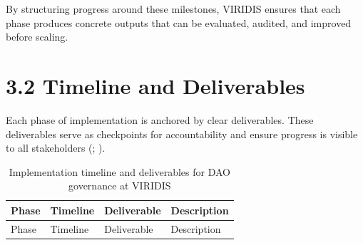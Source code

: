 \documentclass[
  english,
  12pt,
  oneside,
  open=any]{scrbook}
\begin{document}
By structuring progress around these milestones, VIRIDIS ensures that
each phase produces concrete outputs that can be evaluated, audited, and
improved before scaling.

\section{3.2 Timeline and Deliverables}\label{timeline-and-deliverables}

Each phase of implementation is anchored by clear deliverables. These
deliverables serve as checkpoints for accountability and ensure progress
is visible to all stakeholders
(;
).

\begin{longtable}[]{@{}
  >{\raggedright\arraybackslash}p{}
  >{\raggedright\arraybackslash}p{}
  >{\raggedright\arraybackslash}p{}
  >{\raggedright\arraybackslash}p{}@{}}
\caption{Implementation timeline and deliverables for DAO governance at
VIRIDIS}\label{tbl-timeline}\tabularnewline
\toprule\noalign{}
\begin{minipage}[b]{\linewidth}\raggedright
Phase
\end{minipage} & \begin{minipage}[b]{\linewidth}\raggedright
Timeline
\end{minipage} & \begin{minipage}[b]{\linewidth}\raggedright
Deliverable
\end{minipage} & \begin{minipage}[b]{\linewidth}\raggedright
Description
\end{minipage} \\
\midrule\noalign{}
\endfirsthead
\toprule\noalign{}
\begin{minipage}[b]{\linewidth}\raggedright
Phase
\end{minipage} & \begin{minipage}[b]{\linewidth}\raggedright
Timeline
\end{minipage} & \begin{minipage}[b]{\linewidth}\raggedright
Deliverable
\end{minipage} & \begin{minipage}[b]{\linewidth}\raggedright
Description
\end{minipage} \\

\end{longtable}
\end{document}

